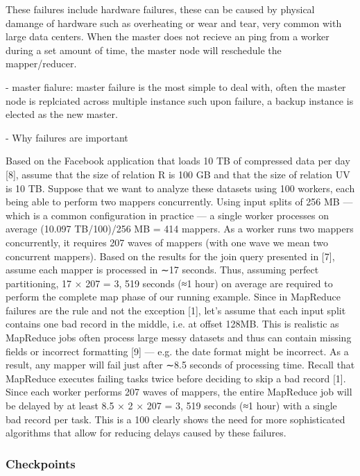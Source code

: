 \documentclass[10pt,twocolumn]{IEEEtran11}
\begin{document}
These failures include hardware failures, these can be caused by physical damange of hardware such as overheating or wear and tear, very common with large data centers. When the master does not recieve an ping from a worker during a set amount of time, the master node will reschedule the mapper/reducer.

- master fialure:
master failure is the most simple to deal with, often the master node is replciated across multiple instance such upon failure, a backup instance is elected as the new master.


- Why failures are important

Based on the Facebook
application that loads 10 TB of compressed data per day [8],
assume that the size of relation R is 100 GB and that the size
of relation UV is 10 TB. Suppose that we want to analyze these
datasets using 100 workers, each being able to perform two
mappers concurrently. Using input splits of 256 MB — which
is a common configuration in practice — a single worker processes
on average (10.097 TB/100)/256 MB = 414 mappers.
As a worker runs two mappers concurrently, it requires 207
waves of mappers (with one wave we mean two concurrent
mappers). Based on the results for the join query presented
in [7], assume each mapper is processed in ∼17 seconds. Thus,
assuming perfect partitioning, 17 × 207 = 3, 519 seconds (≈1
hour) on average are required to perform the complete map
phase of our running example.
Since in MapReduce failures are the rule and not the
exception [1], let’s assume that each input split contains one
bad record in the middle, i.e. at offset 128MB. This is realistic
as MapReduce jobs often process large messy datasets and
thus can contain missing fields or incorrect formatting [9] —
e.g. the date format might be incorrect. As a result, any mapper
will fail just after ∼8.5 seconds of processing time. Recall that
MapReduce executes failing tasks twice before deciding to
skip a bad record [1]. Since each worker performs 207 waves
of mappers, the entire MapReduce job will be delayed by at
least 8.5 × 2 × 207 = 3, 519 seconds (≈1 hour) with a single
bad record per task. This is a 100%
clearly shows the need for more sophisticated algorithms that
allow for reducing delays caused by these failures.

\subsubsection{Checkpoints}
\end{document}
